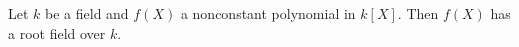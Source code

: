 Let $k$ be a field and $f(X)$ a nonconstant polynomial in $k[X]$. Then $f(X)$ has a root field over $k$.
